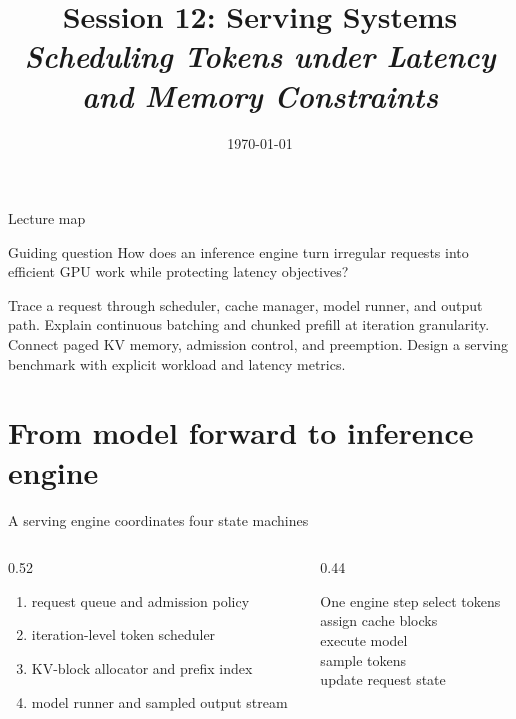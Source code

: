 \documentclass[handout]{beamer}
\title[TLM -- Session 12]{Session 12: Serving Systems\\[4pt]
\normalsize\itshape Scheduling Tokens under Latency and Memory Constraints}
\date{\today}
\begin{document}
\makelecturetitle
\begin{frame}{Lecture map}
  \tableofcontents
  \vfill
  \begin{block}{Guiding question}
    How does an inference engine turn irregular requests into efficient GPU work while protecting latency objectives?
  \end{block}
\end{frame}
\learninggoals
  {Trace a request through scheduler, cache manager, model runner, and output path.}
  {Explain continuous batching and chunked prefill at iteration granularity.}
  {Connect paged KV memory, admission control, and preemption.}
  {Design a serving benchmark with explicit workload and latency metrics.}

\section{From model forward to inference engine}

\begin{frame}{A serving engine coordinates four state machines}
  \begin{columns}[c]
    \begin{column}{0.52\linewidth}
      \begin{enumerate}
        \setlength{\itemsep}{7pt}
        \item request queue and admission policy
        \item iteration-level token scheduler
        \item KV-block allocator and prefix index
        \item model runner and sampled output stream
      \end{enumerate}
    \end{column}
    \begin{column}{0.44\linewidth}
      \begin{block}{One engine step}
        select tokens\\assign cache blocks\\execute model\\sample tokens\\update request state
      \end{block}
    \end{column}
  \end{columns}
\end{frame}
\end{document}
